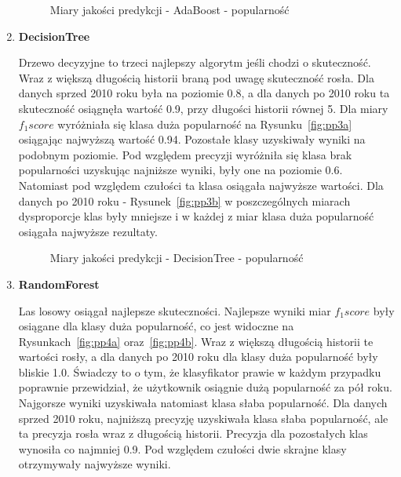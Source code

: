 \documentclass[polish,12pt]{aghthesis}
\begin{document}
\begin{enumerate}
            \begin{figure}[ht] 
    \centering
    \hfill%
    \caption{Miary jakości predykcji - AdaBoost - popularność}
    \label{p:p2}
\end{figure}
    \FloatBarrier

    \item \textbf{DecisionTree}
    
    Drzewo decyzyjne to trzeci najlepszy algorytm jeśli chodzi o skuteczność. Wraz z większą długością historii braną pod uwagę skuteczność rosła. Dla danych sprzed 2010 roku była na poziomie 0.8, a dla danych po 2010 roku ta skuteczność osiągnęła wartość 0.9, przy długości historii równej 5. Dla miary \textit{$f_1 score$} wyróżniała się klasa duża popularność na Rysunku~\ref{fig:pp3a} osiągając najwyższą wartość 0.94. Pozostałe klasy uzyskiwały wyniki na podobnym poziomie. Pod względem precyzji wyróżniła się klasa brak popularności uzyskując najniższe wyniki, były one na poziomie 0.6. Natomiast pod względem czułości ta klasa osiągała najwyższe wartości. Dla danych po 2010 roku - Rysunek~\ref{fig:pp3b} w poszczególnych miarach dysproporcje klas były mniejsze i w każdej z miar klasa duża popularność osiągała najwyższe rezultaty.
    
    
            \begin{figure}[ht] 
    \centering
    \hfill%
    \label{p:p3}
    \caption{Miary jakości predykcji - DecisionTree - popularność}
    
\end{figure}
    \FloatBarrier
    
    \item \textbf{RandomForest}
    
    Las losowy osiągał najlepsze skuteczności. Najlepsze wyniki miar \textit{$f_1 score$} były osiągane dla klasy duża popularność, co jest widoczne na Rysunkach~\ref{fig:pp4a} oraz~\ref{fig:pp4b}. Wraz z większą długością historii te wartości rosły, a dla danych po 2010 roku dla klasy duża popularność były bliskie 1.0. Świadczy to o tym, że klasyfikator prawie w każdym przypadku poprawnie przewidział, że użytkownik osiągnie dużą popularność za pół roku. Najgorsze wyniki uzyskiwała natomiast klasa słaba popularność. Dla danych sprzed 2010 roku, najniższą precyzję uzyskiwała klasa słaba popularność, ale ta precyzja rosła wraz z długością historii. Precyzja dla pozostałych klas wynosiła co najmniej 0.9. Pod względem czułości dwie skrajne klasy otrzymywały najwyższe wyniki.
    

\end{enumerate}
\end{document}

